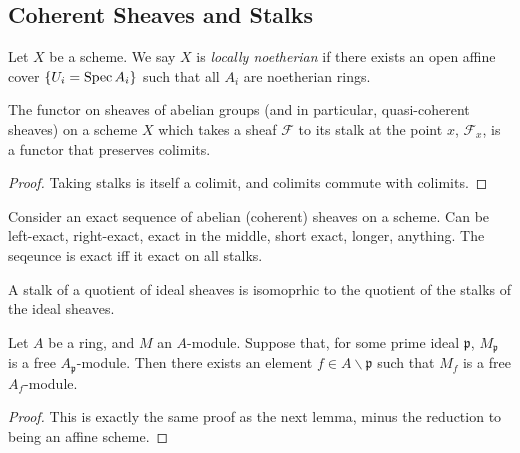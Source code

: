 \subsection{Coherent Sheaves and Stalks}

\begin{definition}
	\label{def:noetherian_scheme}
	Let \(X\) be a scheme. 
	We say \(X\) is \textit{locally noetherian}
	if there exists an open affine cover
	\(\{U_{i} = \operatorname{Spec} A_{i}\}\) such that
	all \(A_{i}\) are noetherian rings.
\end{definition}

\begin{lemma}
  \label{lem:stalks_preserve_colimits}
  The functor on sheaves of abelian groups
  (and in particular, quasi-coherent sheaves)
  on a scheme $X$
  which takes a sheaf $\mathcal{F}$ to its
  stalk at the point $x$, $\mathcal{F}_x$,
  is a functor that preserves colimits.
\end{lemma}

\begin{proof}
  Taking stalks is itself a colimit, and
  colimits commute with colimits.
\end{proof}

\begin{theorem}
  \label{thm:stalk_exact_iff_sheaf_exact}
  Consider an exact sequence of abelian (coherent) sheaves
  on a scheme.
  Can be left-exact, right-exact, exact in the middle,
  short exact, longer, anything.
  The seqeunce is exact iff it exact on all stalks.
\end{theorem}

\begin{corollary}
  \label{cor:stalk_preserves_quotients}
  A stalk of a quotient of ideal sheaves
  is isomoprhic to the quotient of the stalks
  of the ideal sheaves.
\end{corollary}


\begin{lemma}
	\label{lem:affine_stalk_free_implies_locally_free}
	Let \(A\) be a ring, and \(M\) an \(A\)-module.
	Suppose that, for some prime ideal \(\mathfrak{p}\),
	\(M_{\mathfrak{p}}\) is a free
	\(A_{\mathfrak{p}}\)-module.
	Then there exists an element 
	\(f \in A \smallsetminus \mathfrak{p}\)
	such that 
	\(M_{f}\) is a free \(A_{f}\)-module.
\end{lemma}

\begin{proof}
	This is exactly the same proof
	as the next lemma, minus the reduction
	to being an affine scheme.
\end{proof}



